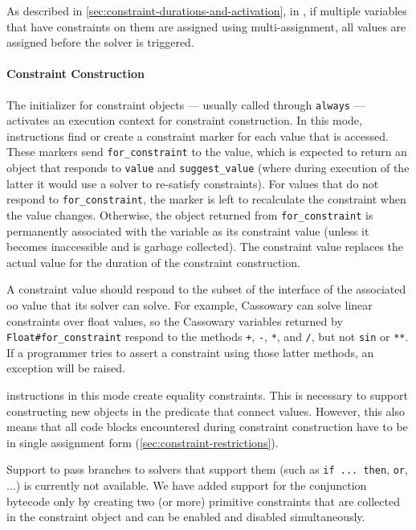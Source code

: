 As described in \autoref{sec:constraint-durations-and-activation}, in
\toolname, if multiple variables that have constraints on them are
assigned using multi-assignment, all values are assigned before the
solver is triggered.

\paragraph{Constraint Construction}
The initializer for constraint objects --- usually called through
\lstinline{always} --- activates an execution context for constraint
construction. In this mode, \load instructions find or create a
constraint marker for each value that is accessed. These markers send
\lstinline{for_constraint} to the value, which is expected to return
an object that responds to \lstinline{value} and
\lstinline{suggest_value} (where during execution of the latter it
would use a solver to re-satisfy constraints). For values that do not
respond to \lstinline{for_constraint}, the marker is left to
recalculate the constraint when the value changes. Otherwise, the
object returned from \lstinline{for_constraint} is permanently
associated with the variable as its constraint value (unless it
becomes inaccessible and is garbage collected). The constraint
value replaces the actual value for the duration of the constraint
construction.

A constraint value should respond to the subset of the interface of
the associated \ac{oo} value that its solver can solve. For example,
Cassowary can solve linear constraints over float values, so the
Cassowary variables returned by \lstinline{Float#for_constraint}
respond to the methods \lstinline{+}, \lstinline{-}, \lstinline{*},
and \lstinline{/}, but not \lstinline{sin} or \lstinline{**}. If a
programmer tries to assert a constraint using those latter methods, an
exception will be raised.

\store instructions in this mode create equality constraints. This is
necessary to support constructing new objects in the predicate that
connect values. However, this also means that all code blocks
encountered during constraint construction have to be in single
assignment form (\autoref{sec:constraint-restrictions}).

Support to pass branches to solvers that support them (such as
\lstinline{if ... then}, \lstinline{or}, ...) is currently not
available. We have added support for the conjunction bytecode only by
creating two (or more) primitive constraints that are collected in the
constraint object and can be enabled and disabled simultaneously.

